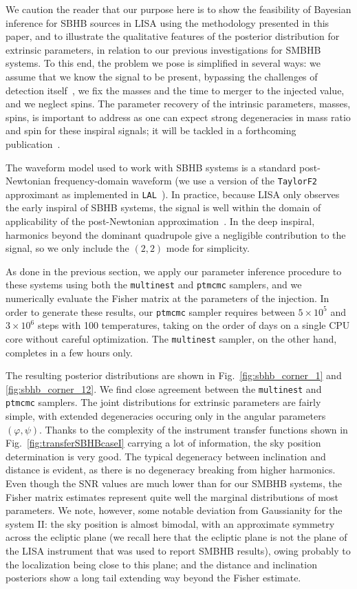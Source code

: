 \documentclass[aps,showpacs,twocolumn,prd,superscriptaddress,nofootinbib]{revtex4-1}
\begin{document}
We caution the reader that our purpose here is to show the feasibility of
Bayesian inference for SBHB sources in LISA using the methodology presented in
this paper, and to illustrate the qualitative features of the posterior distribution for extrinsic parameters, in relation to our previous investigations for SMBHB systems. To this end, the problem we pose is simplified
in several ways: we assume that we know the signal to be present, bypassing the challenges of detection itself~\cite{Moore+19}, we fix the masses and the time to merger to the injected value, and we neglect spins. The parameter recovery of the intrinsic parameters, masses, spins, is important to address as one can expect strong degeneracies in mass ratio and spin for these inspiral signals; it will be tackled in a forthcoming publication~\cite{Toubiana+20}. 

The waveform model used to work with SBHB systems is a standard post-Newtonian
frequency-domain waveform (we use a version of the \texttt{TaylorF2} approximant as implemented in \texttt{LAL}~\cite{lal}). In practice, because LISA only observes the early
inspiral of SBHB systems, the signal is well within the domain of applicability of the post-Newtonian approximation~\cite{Mangiagli+18}. In the deep inspiral, harmonics beyond the dominant quadrupole give a negligible
contribution to the signal, so we only include the $(2,2)$ mode for simplicity.

As done in the previous section, we apply our parameter inference procedure to
these systems using both the \texttt{multinest} and \texttt{ptmcmc} samplers, and we
numerically evaluate the Fisher matrix at the parameters of the injection. In order to generate these results, our \texttt{ptmcmc} sampler requires between
$5\times 10^5$ and $3\times 10^6$ steps with 100 temperatures, taking on the
order of days on a single CPU core without careful optimization. The \texttt{multinest}
sampler, on the other hand, completes in a few hours only.

The resulting posterior distributions are shown in Fig.~\ref{fig:sbhb_corner_1}
and \ref{fig:sbhb_corner_12}. We find close agreement between the \texttt{multinest} and
\texttt{ptmcmc} samplers. The joint distributions for extrinsic parameters are fairly simple, with extended degeneracies occuring only in the angular parameters $(\varphi, \psi)$. Thanks to the complexity of the instrument transfer functions shown in Fig.~\ref{fig:transferSBHBcaseI} carrying a lot of information, the sky position determination is very good. The typical degeneracy between inclination and distance
is evident, as there is no degeneracy breaking from higher harmonics. Even though the SNR values are much lower than for our SMBHB systems, the Fisher matrix estimates represent quite well the marginal
distributions of most parameters. We note, however, some notable deviation from Gaussianity for the system II: the sky position is almost bimodal, with an approximate symmetry across the ecliptic plane (we recall here that the ecliptic plane is not the plane of the LISA instrument that was used to report SMBHB results), owing probably to the localization being close to this plane; and the distance and inclination posteriors show a long tail extending way beyond the Fisher estimate. 
\end{document}
